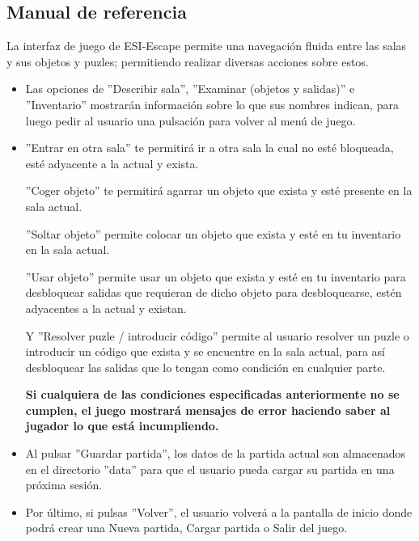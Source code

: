 \subsection{Manual de referencia}

La interfaz de juego de ESI-Escape permite una navegación fluida entre las salas y sus objetos y puzles; permitiendo realizar diversas acciones sobre estos.
\bigskip
\begin{itemize}
	\item Las opciones de ''Describir sala'', ''Examinar (objetos y salidas)'' e ''Inventario'' mostrarán información sobre lo que sus nombres indican, para luego pedir al usuario una pulsación para volver al menú de juego.
	\item ''Entrar en otra sala'' te permitirá ir a otra sala la cual no esté bloqueada, esté adyacente a la actual y exista.\bigskip

''Coger objeto'' te permitirá agarrar un objeto que exista y esté presente en la sala actual.\bigskip

''Soltar objeto'' permite colocar un objeto que exista y esté en tu inventario en la sala actual.\bigskip

''Usar objeto'' permite usar un objeto que exista y esté en tu inventario para desbloquear salidas que requieran de dicho objeto para desbloquearse, estén adyacentes a la actual y existan.\bigskip

Y ''Resolver puzle / introducir código'' permite al usuario resolver un puzle o introducir un código que exista y se encuentre en la sala actual, para así desbloquear las salidas que lo tengan como condición en cualquier parte.\bigskip

\textbf{Si cualquiera de las condiciones especificadas anteriormente no se cumplen, el juego mostrará mensajes de error haciendo saber al jugador lo que está incumpliendo.}

\item Al pulsar ''Guardar partida'', los datos de la partida actual son almacenados en el directorio ''data'' para que el usuario pueda cargar su partida en una próxima sesión.

\item Por último, si pulsas ''Volver'', el usuario volverá a la pantalla de inicio donde podrá crear una Nueva partida, Cargar partida o Salir del juego.

\end{itemize}